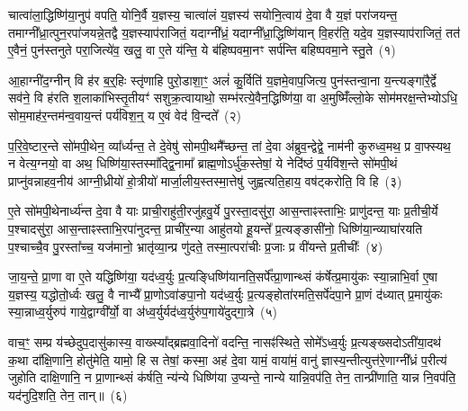 \setcounter{anuvakam}{0}
चात्वा॑ला॒द्धिष्णि॑या॒नुप॑ वपति॒ योनि॒र्वै य॒ज्ञस्य॒ चात्वा॑लं य॒ज्ञस्य॑ सयोनि॒त्वाय॑ दे॒वा वै य॒ज्ञं परा॑जयन्त॒ तमाग्नी᳚ध्रा॒त्पुन॒रपा॑जयन्ने॒तद्वै य॒ज्ञस्याप॑राजितं॒ यदाग्नी᳚ध्रं॒ यदाग्नी᳚ध्रा॒द्धिष्णि॑यान् वि॒हर॑ति॒ यदे॒व य॒ज्ञस्याप॑राजितं॒ तत॑ ए॒वैनं॒ पुन॑स्तनुते परा॒जित्ये॑व॒ खलु॒ वा ए॒ते य॑न्ति॒ ये ब॑हिष्पवमा॒नꣳ सर्प॑न्ति बहिष्पवमा॒ने स्तु॒ते~(१)

आ॒हाग्नी॑द॒ग्नीन् वि ह॑र ब॒र्॒\mbox{}हिः स्तृ॑णाहि पुरो॒डाशा॒ꣳ॒ अलं॑ कु॒र्विति॑ य॒ज्ञमे॒वाप॒जित्य॒ पुन॑स्तन्वा॒ना य॒न्त्यङ्गा॑रै॒र्द्वे सव॑ने॒ वि ह॑रति श॒लाका॑भिस्तृ॒तीयꣳ॑ सशुक्र॒त्वायाथो॒ सम्भ॑रत्ये॒वैन॒द्धिष्णि॑या॒ वा अ॒मुष्मिँ॑ल्लो॒के सोम॑मरक्ष॒न्तेभ्यो\-ऽधि॒ सोम॒माह॑र॒न्तम॑न्व॒वाय॒न्तं पर्य॑विश॒न्॒ य ए॒वं वेद॑ वि॒न्दते᳚~(२)

प॒रि॒वे॒ष्टार॒न्ते सो॑मपी॒थेन॒ व्या᳚र्ध्यन्त॒ ते दे॒वेषु॑ सोमपी॒थमै᳚च्छन्त॒ तां दे॒वा अ॑ब्रुव॒न्द्वेद्वे॒ नाम॑नी कुरुध्व॒मथ॒ प्र वा॒फ्स्यथ॒ न वेत्य॒ग्नयो॒ वा अथ॒ धिष्णि॑या॒स्तस्मा᳚द्द्वि॒नामा᳚ ब्राह्म॒णो\-ऽर्धु॑क॒स्तेषां॒ ये नेदि॑ष्ठं प॒र्यवि॑श॒न्ते सो॑मपी॒थं प्राप्नु॑वन्नाहव॒नीय॑ आग्नी॒ध्रीयो॑ हो॒त्रीयो॑ मार्जा॒लीय॒स्तस्मा॒त्तेषु॑ जुह्वत्यति॒हाय॒ वष॑ट्करोति॒ वि हि~(३)

ए॒ते सो॑मपी॒थेनार्ध्य॑न्त दे॒वा वै याः प्राची॒राहु॑ती॒रजु॑हवु॒र्ये पु॒रस्ता॒दसु॑रा॒ आस॒न्ताꣴस्ताभिः॒ प्राणु॑दन्त॒ याः प्र॒तीची॒र्ये प॒श्चादसु॑रा॒ आस॒न्ताꣴस्ताभि॒रपा॑नुदन्त॒ प्राची॑र॒न्या आहु॑तयो हू॒यन्ते᳚ प्र॒त्यङ्ङासी॑नो॒ धिष्णि॑या॒न्व्याघा॑रयति प॒श्चाच्चै॒व पु॒रस्ता᳚च्च॒ यज॑मानो॒ भ्रातृ॑व्या॒न्प्र णु॑दते॒ तस्मा॒त्परा॑चीः प्र॒जाः प्र वी॑यन्ते प्र॒तीचीः᳚~(४)

जा॒य॒न्ते॒ प्रा॒णा वा ए॒ते यद्धिष्णि॑या॒ यद॑ध्व॒र्युः प्र॒त्यङ्धिष्णि॑यानति॒सर्पे᳚त्प्रा॒णान्थ्सं क॑र्\mbox{}षेत्प्र॒मायु॑कः स्या॒न्नाभि॒र्वा ए॒षा य॒ज्ञस्य॒ यद्धोतो॒र्ध्वः खलु॒ वै नाभ्यै᳚ प्रा॒णो\-ऽवा॑ङपा॒नो यद॑ध्व॒र्युः प्र॒त्यङ्होता॑रमति॒सर्पे॑दपा॒ने प्रा॒णं द॑ध्यात् प्र॒मायु॑कः स्या॒न्नाध्व॒र्युरुप॑ गाये॒द्वाग्वी᳚र्यो॒ वा अ॑ध्व॒र्युर्यद॑ध्व॒र्युरु॑प॒गाये॑दुद्गा॒त्रे~(५)

वाच॒ꣳ॒ सम्प्र य॑च्छेदुप॒दासु॑कास्य॒ वाख्स्या᳚द्ब्रह्मवा॒दिनो॑ वदन्ति॒ नासꣴ॑स्थिते॒ सोमे᳚\-ऽध्व॒र्युः प्र॒त्यङ्ख्सदो\-ऽती॑या॒दथ॑ क॒था दा᳚क्षि॒णानि॒ होतु॑मेति॒ यामो॒ हि स तेषां॒ कस्मा॒ अह॑ दे॒वा यामं॒ वाया॑मं॒ वानु॑ ज्ञास्य॒न्तीत्युत्त॑रे॒णाग्नी᳚ध्रं प॒रीत्य॑ जुहोति दाक्षि॒णानि॒ न प्रा॒णान्थ्सं क॑र्\mbox{}षति॒ न्य॑न्ये धिष्णि॑या उ॒प्यन्ते॒ नान्ये यान्नि॒वप॑ति॒ तेन॒ तान्प्री॑णाति॒ यान्न नि॒वप॑ति॒ यद॑नुदि॒शति॒ तेन॒ तान्॥~(६)

